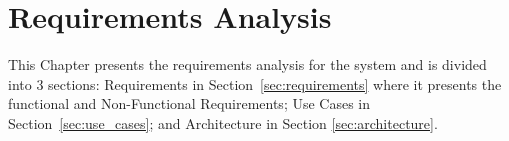 \chapter{Requirements Analysis}
\label{ch:requirements_analysis}

This Chapter presents the requirements analysis for the system and is divided
into 3 sections: Requirements in Section~\ref{sec:requirements} where it
presents the functional and Non-Functional Requirements; Use Cases in
Section~\ref{sec:use_cases}; and Architecture in Section
\ref{sec:architecture}.




